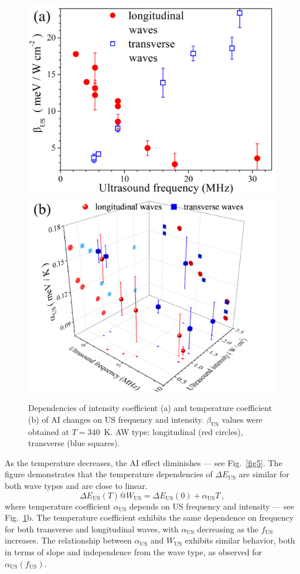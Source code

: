 \documentclass{ttp}
\begin{document}
\begin{figure}
	\centering
     \includegraphics[width=0.4\linewidth]{Fig4a.png}
     \includegraphics[width=0.4\linewidth]{Fig4b.png}
	  \caption{Dependencies of intensity coefficient (a)
       and temperature coefficient (b) of AI changes on US frequency and intensity.
       $\beta_\mathrm{US}$ values were obtained at $T=340$~K.
       AW type: longitudinal (red circles), transverse (blue squares).
}\label{fig4}
\end{figure}

As the temperature decreases, the AI effect diminishes --- see Fig.~\ref{fig5}.
The figure demonstrates that the temperature dependencies of $\Delta E_\mathrm{US}$ are similar for both wave types and are close to linear.
\begin{equation}
\label{eqEmT}
\Delta E_\mathrm{US}(T)@ W_\mathrm{US}=\Delta E_\mathrm{US}(0)+\alpha_\mathrm{US}T\,,
\end{equation}
where temperature coefficient $\alpha_\mathrm{US}$ depends on US frequency and intensity --- see Fig.~\ref{fig4}b.
The temperature coefficient exhibits the same dependence on frequency 
for both transverse and longitudinal waves, with $\alpha_\mathrm{US}$ decreasing as the $f_\mathrm{US}$ increases.
The relationship between $\alpha_\mathrm{US}$ and $W_\mathrm{US}$ exhibits 
similar behavior, both in terms of slope and independence from the wave type, as observed for $\alpha_\mathrm{US}(f_\mathrm{US})$.
\end{document}
